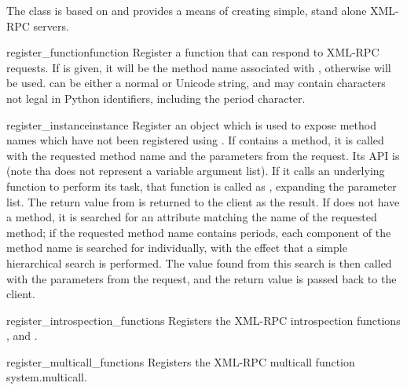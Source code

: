 The  class is based on
 and provides a means of creating
simple, stand alone XML-RPC servers.

\begin{methoddesc}[SimpleXMLRPCServer]{register_function}{function}
  Register a function that can respond to XML-RPC requests.  If
   is given, it will be the method name associated with
  , otherwise  will be
  used.   can be either a normal or Unicode string, and may
  contain characters not legal in Python identifiers, including the
  period character.
\end{methoddesc}

\begin{methoddesc}[SimpleXMLRPCServer]{register_instance}{instance}
  Register an object which is used to expose method names which have
  not been registered using .  If
   contains a  method, it is called
  with the requested method name and the parameters from the request.  Its
  API is  (note tha
   does not represent a variable argument list).  If it calls an
  underlying function to perform its task, that function is called as
  , expanding the parameter list.
  The return value from  is returned to the client as
  the result.  If
   does not have a  method, it is
  searched for an attribute matching the name of the requested method;
  if the requested method name contains periods, each component of the
  method name is searched for individually, with the effect that a
  simple hierarchical search is performed.  The value found from this
  search is then called with the parameters from the request, and the
  return value is passed back to the client.
\end{methoddesc}

\begin{methoddesc}{register_introspection_functions}{}
  Registers the XML-RPC introspection functions ,
   and . 
\end{methoddesc}

\begin{methoddesc}{register_multicall_functions}{}
  Registers the XML-RPC multicall function system.multicall.
\end{methoddesc}

